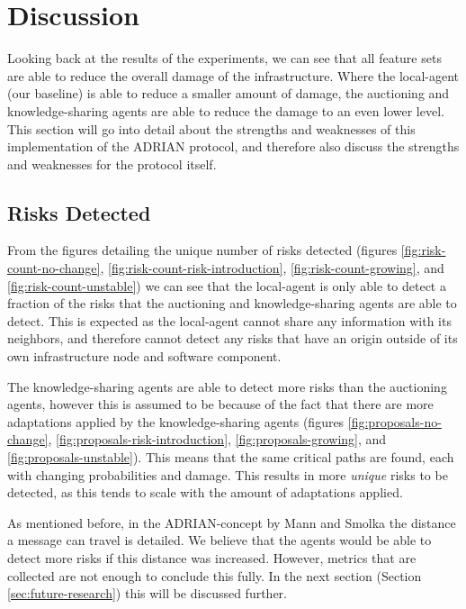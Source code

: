 \section{Discussion}
\label{sec:discussion}
Looking back at the results of the experiments, we can see that all feature sets are able to reduce the overall damage of the infrastructure. Where the local-agent (our baseline) is able to reduce a smaller amount of damage, the auctioning and knowledge-sharing agents are able to reduce the damage to an even lower level. This section will go into detail about the strengths and weaknesses of this implementation of the ADRIAN protocol, and therefore also discuss the strengths and weaknesses for the protocol itself. 

\subsection{Risks Detected}
\label{ssec:risks-detected}
From the figures detailing the unique number of risks detected (figures \ref{fig:risk-count-no-change}, \ref{fig:risk-count-risk-introduction}, \ref{fig:risk-count-growing}, and \ref{fig:risk-count-unstable}) we can see that the local-agent is only able to detect a fraction of the risks that the auctioning and knowledge-sharing agents are able to detect. This is expected as the local-agent cannot share any information with its neighbors, and therefore cannot detect any risks that have an origin outside of its own infrastructure node and software component.

The knowledge-sharing agents are able to detect more risks than the auctioning agents, however this is assumed to be because of the fact that there are more adaptations applied by the knowledge-sharing agents (figures \ref{fig:proposals-no-change}, \ref{fig:proposals-risk-introduction}, \ref{fig:proposals-growing}, and \ref{fig:proposals-unstable}). This means that the same critical paths are found, each with changing probabilities and damage. This results in more \emph{unique} risks to be detected, as this tends to scale with the amount of adaptations applied. 

As mentioned before, in the ADRIAN-concept by Mann and Smolka \cite{mann2023ADRIAN} the distance a message can travel is detailed. We believe that the agents would be able to detect more risks if this distance was increased. However, metrics that are collected are not enough to conclude this fully. In the next section (Section \ref{sec:future-research}) this will be discussed further.

